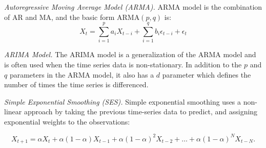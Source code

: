 \documentclass[11pt]{article}
\begin{document}
\textit{Autoregressive Moving Average Model (ARMA).} ARMA model is the combination of AR and MA, and the basic form ARMA$(p,q)$ is:
\begin{equation}
	X_t = \sum_{i=1}^{p}a_iX_{t-i}+\sum_{i=1}^{q}b_i\epsilon_{t-i}+\epsilon_t
\end{equation}

\textit{ARIMA Model.} The ARIMA model is a generalization of the ARMA model and is often used when the time series data is non-stationary. In addition to the $p$ and $q$ parameters in the ARMA model, it also has a $d$ parameter which defines the number of times the time series is differenced. 

\textit{Simple Exponential Smoothing (SES).} Simple exponential smoothing uses a non-linear approach by taking the previous time-series data to predict, and assigning exponential weights to the observations:

\begin{equation}
	X_{t+1}=\alpha X_t+\alpha(1-\alpha)X_{t-1}+\alpha(1-\alpha)^2X_{t-2}+\ldots+\alpha(1-\alpha)^N X_{t-N}.
\end{equation}
\end{document}
